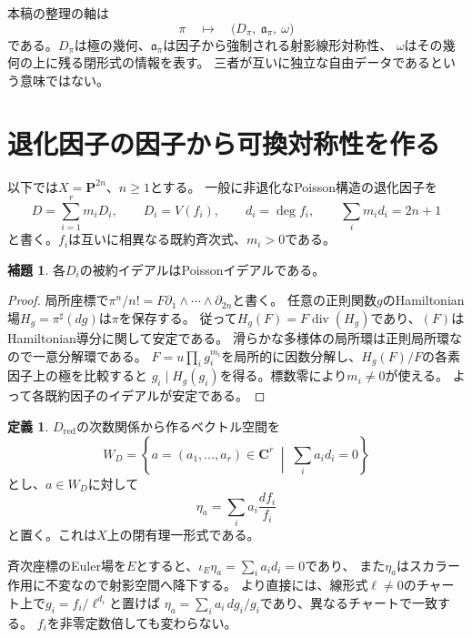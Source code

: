 \documentclass[a4paper,11pt]{ltjsarticle}
\theoremstyle{definition}
\newtheorem{lemma}[theorem]{補題}
\theoremstyle{definition}\newtheorem{definition}[theorem]{定義}
\theoremstyle{remark}\newtheorem{remark}[theorem]{注意}
\newcommand{\PP}{\mathbf P}\newcommand{\CC}{\mathbf C}
\newcommand{\diver}{\operatorname{div}}\newcommand{\Pf}{\operatorname{Pf}}
\begin{document}
本稿の整理の軸は
\[
 \pi\quad\longmapsto\quad
 \bigl(D_\pi,\ \mathfrak a_\pi,\ \omega\bigr)
\]
である。$D_\pi$は極の幾何、$\mathfrak a_\pi$は因子から強制される射影線形対称性、
$\omega$はその幾何の上に残る閉形式の情報を表す。
三者が互いに独立な自由データであるという意味ではない。

\section{退化因子の因子から可換対称性を作る}
以下では$X=\PP^{2n}$、$n\ge1$とする。
一般に非退化なPoisson構造の退化因子を
\[
 D=\sum_{i=1}^{r}m_iD_i,\qquad D_i=V(f_i),\qquad
 d_i=\deg f_i,\qquad \sum_i m_id_i=2n+1
\]
と書く。$f_i$は互いに相異なる既約斉次式、$m_i>0$である。

\begin{lemma}\label{lem:tangent}
各$D_i$の被約イデアルはPoissonイデアルである。
\end{lemma}
\begin{proof}
局所座標で$\pi^n/n!=F\partial_1\wedge\cdots\wedge\partial_{2n}$と書く。
任意の正則関数$g$のHamiltonian場$H_g=\pi^\sharp(dg)$は$\pi$を保存する。
従って$H_g(F)=F\diver(H_g)$であり、$(F)$はHamiltonian導分に関して安定である。
滑らかな多様体の局所環は正則局所環なので一意分解環である。
$F=u\prod_i g_i^{m_i}$を局所的に因数分解し、$H_g(F)/F$の各素因子上の極を比較すると
$g_i\mid H_g(g_i)$を得る。標数零により$m_i\ne0$が使える。
よって各既約因子のイデアルが安定である。
\end{proof}

\begin{definition}
$D_{\mathrm{red}}$の次数関係から作るベクトル空間を
\[
 W_D=\left\{a=(a_1,\ldots,a_r)\in\CC^r\;\middle|\;
              \sum_i a_id_i=0\right\}
\]
とし、$a\in W_D$に対して
\[
 \eta_a=\sum_i a_i\frac{df_i}{f_i}
\]
と置く。これは$X$上の閉有理一形式である。
\end{definition}

斉次座標のEuler場を$E$とすると、$\iota_E\eta_a=\sum_i a_id_i=0$であり、
また$\eta_a$はスカラー作用に不変なので射影空間へ降下する。
より直接には、線形式$\ell\ne0$のチャート上で$g_i=f_i/\ell^{d_i}$と置けば
$\eta_a=\sum_i a_i\,dg_i/g_i$であり、異なるチャートで一致する。
$f_i$を非零定数倍しても変わらない。
\end{document}
